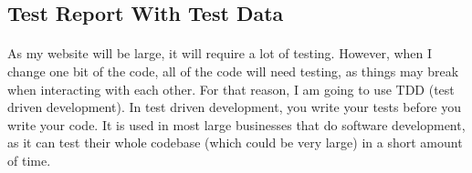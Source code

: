 \subsection{Test Report With Test Data}
\paragraph{}
As my website will be large, it will require a lot of testing. However, when I change one bit of the code, all of the code will need testing, as things may break when interacting with each other. For that reason, I am going to use TDD (test driven development). In test driven development, you write your tests before you write your code. It is used in most large businesses that do software development, as it can test their whole codebase (which could be very large) in a short amount of time.